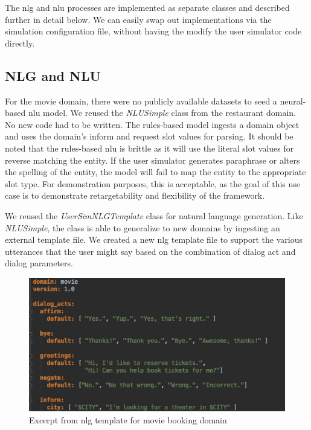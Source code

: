 The nlg and nlu processes are implemented as separate classes and described further in detail below. We can easily swap out implementations via the simulation configuration file, without having the modify the user simulator code directly.

\subsection{NLG and NLU}

For the movie domain, there were no publicly available datasets to seed a neural-based nlu model. We reused the \textit{NLUSimple} class from the restaurant domain. No new code had to be written. The rules-based model ingests a domain object and uses the domain's inform and request slot values for parsing. It should be noted that the rules-based nlu is brittle as it will use the literal slot values for reverse matching the entity. If the user simulator generates paraphrase or alters the spelling of the entity, the model will fail to map the entity to the appropriate slot type. For demonstration purposes, this is acceptable, as the goal of this use case is to demonstrate retargetability and flexibility of the framework.

We reused the \textit{UserSimNLGTemplate} class for natural language generation. Like \textit{NLUSimple}, the class is able to generalize to new domains by ingesting an external template file. We created a new nlg template file to support the various utterances that the user might say based on the combination of dialog act and dialog parameters. 

\begin{figure}[h!]
	\centering
	\includegraphics[scale=.25]{diagrams/movie_nlg_template.jpeg}
	\caption{Excerpt from nlg template for movie booking domain }
	\label{fig:movie_nlg}
\end{figure}

